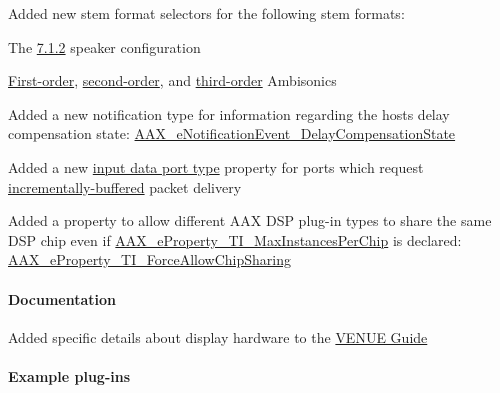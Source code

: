 \begin{DoxyItemize}
\item Added new stem format selectors for the following stem formats\+: 
\begin{DoxyItemize}
\item The \hyperlink{a00206_ad8af5ef008b2bd478add9a0acb0a1d85a434dbed527c350cb45787299ead28156}{7.1.2} speaker configuration 
\item \hyperlink{a00206_ad8af5ef008b2bd478add9a0acb0a1d85a398f50508a237917d9c81be645ca4b90}{First-\/order}, \hyperlink{a00206_ad8af5ef008b2bd478add9a0acb0a1d85af6461ee858e0f121f7a070142f047dbb}{second-\/order}, and \hyperlink{a00206_ad8af5ef008b2bd478add9a0acb0a1d85a111ef1882171d9eea1b1b436e037fb47}{third-\/order} Ambisonics 
\end{DoxyItemize}
\item Added a new notification type for information regarding the host\textquotesingle{}s delay compensation state\+: \hyperlink{a00206_afab5ea2cfd731fc8f163b6caa685406ea3336fd8cb2428399ab640ee91582c626}{A\+A\+X\+\_\+e\+Notification\+Event\+\_\+\+Delay\+Compensation\+State}  
\item Added a new \hyperlink{a00206_ab5677b173ad8647c24d34d28272d11fc}{input data port type} property for ports which request \hyperlink{a00206_ab5677b173ad8647c24d34d28272d11fca4c356b21e878cfafca33ff61e1044b2e}{incrementally-\/buffered} packet delivery 
\item Added a property to allow different A\+A\+X D\+S\+P plug-\/in types to share the same D\+S\+P chip even if \hyperlink{a00283_a6571f4e41a5dd06e4067249228e2249ea5b85e213113b7f0f7ee4bac4f5eaa59d}{A\+A\+X\+\_\+e\+Property\+\_\+\+T\+I\+\_\+\+Max\+Instances\+Per\+Chip} is declared\+: \hyperlink{a00283_a6571f4e41a5dd06e4067249228e2249ea2f040408f0cc8d72f8069db8b3192ee7}{A\+A\+X\+\_\+e\+Property\+\_\+\+T\+I\+\_\+\+Force\+Allow\+Chip\+Sharing}  
\end{DoxyItemize}\hypertarget{a00375_aax_sdk_2p2p2_Documentation}{}\paragraph{Documentation}\label{a00375_aax_sdk_2p2p2_Documentation}

\begin{DoxyItemize}
\item Added specific details about display hardware to the \hyperlink{a00377}{V\+E\+N\+U\+E Guide} 
\end{DoxyItemize}\hypertarget{a00375_aax_sdk_2p2p2_Example_plugins}{}\paragraph{Example plug-\/ins}\label{a00375_aax_sdk_2p2p2_Example_plugins}

